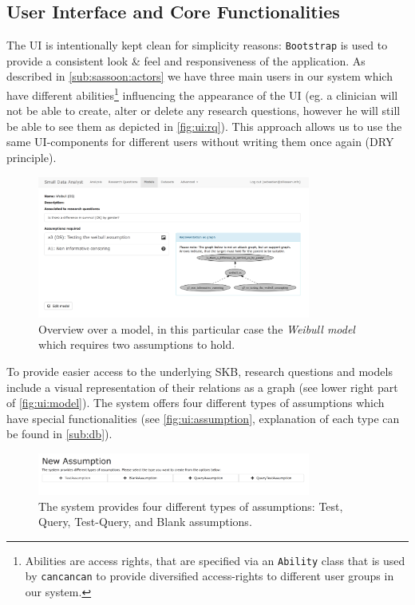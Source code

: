 \subsection{User Interface and Core Functionalities}
\label{sub:ui}

The \gls{UI} is intentionally kept clean for simplicity reasons: \texttt{Bootstrap} is used to provide a consistent look \& feel and responsiveness of the application. As described in \autoref{sub:sassoon:actors} we have three main users in our system which have different abilities\footnote{Abilities are access rights, that are specified via an \texttt{Ability} class that is used by \texttt{cancancan} to provide diversified access-rights to different user groups in our system.} influencing the appearance of the \gls{UI} (eg. a clinician will not be able to create, alter or delete any research questions, however he will still be able to see them as depicted in \autoref{fig:ui:rq}). This approach allows us to use the same \gls{UI}-components for different users without writing them once again (\gls{DRY} principle).

\begin{figure}[h]
\centering
\includegraphics[width=0.8\textwidth]{figures/ui_Weibull_Model}
\caption{Overview over a model, in this particular case the \textit{Weibull model} which requires two assumptions to hold.}
\label{fig:ui:model}
\end{figure}


To provide easier access to the underlying \gls{SKB}, research questions and models include a visual representation of their relations as a graph (see lower right part of \autoref{fig:ui:model}). The system offers four different types of assumptions which have special functionalities (see \autoref{fig:ui:assumption}, explanation of each type can be found in \autoref{sub:db}).

\begin{figure}[t!]
\centering
\includegraphics[width=0.8\textwidth]{figures/ui_new_assumption}
\caption{The system provides four different types of assumptions: Test, Query, Test-Query, and Blank assumptions.}
\label{fig:ui:assumption}
\end{figure}

